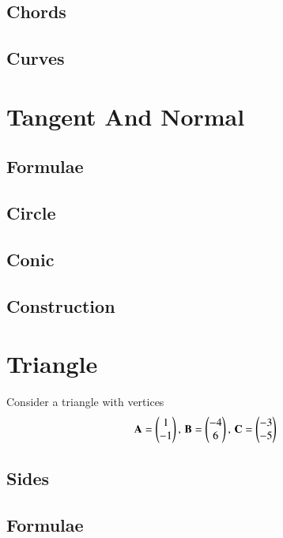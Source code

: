 \documentclass[journal]{IEEEtran}
\begin{document}
\subsection{Chords}

\subsection{Curves}


\newpage
\section{Tangent And Normal}
\subsection{Formulae}

\subsection{Circle}

\subsection{Conic}

\subsection{Construction}

%
\appendices
\section{Triangle}
Consider a triangle with vertices
		\begin{align}
			\label{eq:app-tri-pts}
			\mathbf{A} = \begin{pmatrix}1 \\ -1\end{pmatrix},\,
			\mathbf{B} = \begin{pmatrix}-4 \\ 6\end{pmatrix},\,
			\mathbf{C} = \begin{pmatrix}-3 \\ -5\end{pmatrix}
		\end{align}
\subsection{Sides}

\subsection{Formulae}

\end{document}
